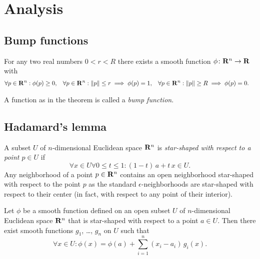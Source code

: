 \chapter{Analysis}

\section{Bump functions}
\label{sec:bump_functions}

\begin{thm}
  \label{thm:bump_function}
  For any two real numbers $0 < r < R$ there exists a smooth
  function $\phi\colon \mathbf{R}^n \to \mathbf{R}$ with
  \begin{align*}
    \forall p \in \mathbf{R}^n: \phi(p) & \ge 0, &
    \forall p \in \mathbf{R}^n: \lVert p\rVert \leq r \implies \phi(p) & = 1, &
    \forall p \in \mathbf{R}^n: \lVert p\rVert \geq R \implies \phi(p) & = 0.
  \end{align*}
\end{thm}

A function as in the theorem is called a \emph{bump function}.

\section{Hadamard's lemma}

A subset $U$ of $n$-dimensional Euclidean space $\mathbf{R}^n$ is \emph{star-shaped with
respect to a point $p \in U$} if
\[
  \forall x \in U \forall 0 \leq t \leq 1 :
  (1 - t) \, a + t \, x \in U.
\]
Any neighborhood of a point $p \in \mathbf{R}^n$ contains an open neighborhood
star-shaped with respect to the point $p$ as the standard $\epsilon$-neighborhoods
are star-shaped with respect to their center (in fact, with respect to any point
of their interior).

\begin{thm}
  \label{thm:hadamard}
  Let $\phi$ be a smooth function defined on an open subset $U$ of $n$-dimensional
  Euclidean space $\mathbf{R}^n$ that is star-shaped with respect to a point $a \in U$.
  Then there exist smooth functions $g_1$, \dots, $g_n$ on $U$ such that
  \[
    \forall x \in U: \phi(x) = \phi(a) + \sum_{i = 1}^n (x_i - a_i) \, g_i(x).
  \]
\end{thm}
